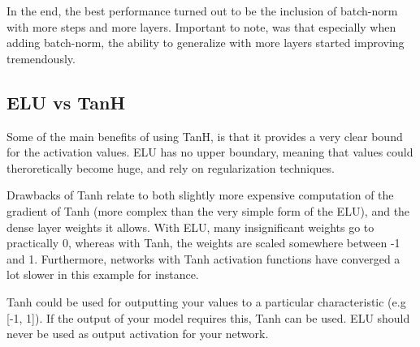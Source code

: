 In the end, the best performance turned out to be the inclusion of batch-norm with more steps and more layers.
Important to note, was that especially when adding batch-norm, the ability to generalize with more layers started improving
tremendously.

\subsection{ELU vs TanH}
Some of the main benefits of using TanH, is that it provides a very clear bound for the activation values. 
ELU has no upper boundary, meaning that values could theroretically become huge, and rely on regularization
techniques. 

Drawbacks of Tanh relate to both slightly more expensive computation of the gradient of Tanh (more complex than
the very simple form of the ELU), and the dense layer weights it allows. With ELU, many insignificant weights
go to practically 0, whereas with Tanh, the weights are scaled somewhere between -1 and 1. Furthermore, 
networks with Tanh activation functions have converged a lot slower in this example for instance. 

Tanh could be used for outputting your values to a particular characteristic (e.g [-1, 1]). If the output
of your model requires this, Tanh can be used. ELU should never be used as output activation for your network.